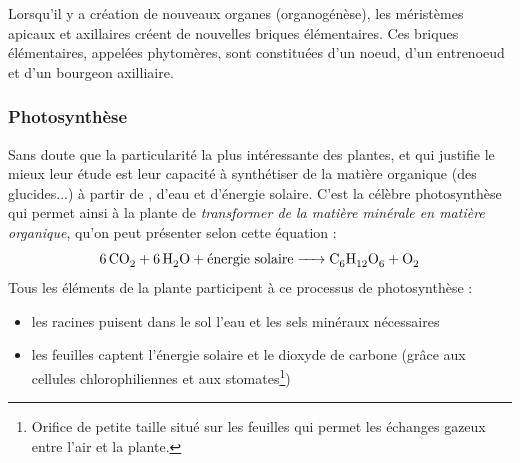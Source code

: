 Lorsqu'il y a création de nouveaux organes (organogénèse), les méristèmes apicaux et axillaires créent de nouvelles briques élémentaires. 
Ces briques élémentaires, appelées phytomères, sont constituées d'un noeud, d'un entrenoeud et d'un bourgeon axilliaire.


\subsubsection{Photosynthèse}


Sans doute que la particularité la plus intéressante des plantes, et qui justifie le mieux leur étude est leur capacité à synthétiser de la matière organique (des glucides...) à partir de , d'eau et d'énergie solaire. C'est la célèbre photosynthèse qui permet ainsi à la plante de \textit{transformer de la matière minérale en matière organique}, qu'on peut présenter selon cette équation : 
\[
	\ce{6CO2 + 6H2O + \text{énergie solaire} -> C6H12O6 + O2 }
\]
Tous les éléments de la plante participent à ce processus de photosynthèse :
\begin{itemize}
	\item les racines puisent dans le sol l'eau et les sels minéraux nécessaires		
	\item les feuilles captent l'énergie solaire et le dioxyde de carbone 
  (grâce aux cellules chlorophiliennes 
  et aux stomates\footnote{Orifice de petite taille situé sur les feuilles 
  qui permet les échanges gazeux entre l'air et la plante.})
\end{itemize}

